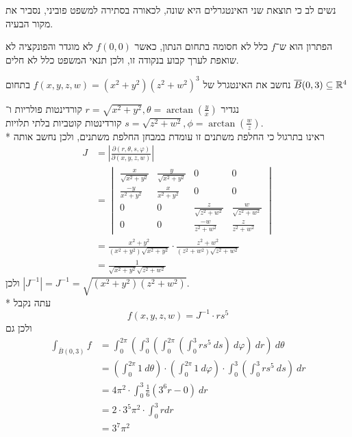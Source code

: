 \Subquestion{}
נשים לב כי תוצאת שני האינטגרלים היא שונה, לכאורה בסתירה למשפט פוביני, נסביר את מקור הבעיה.

הפתרון הוא ש־$f$ כלל לא חסומה בתחום הנתון, כאשר $f(0, 0)$ לא מוגדר והפונקציה לא שואפת לערך קבוע בנקודה זו, ולכן תנאי המשפט כלל לא חלים.

\Question{}
נחשב את האינטגרל של $f(x, y, z, w) = (x^2 + y^2) {(z^2 + w^2)}^3$ בתחום $\overline{B}(0, 3) \subseteq \mathbb{R}^4$

נגדיר $r = \sqrt{x^2 + y^2}, \theta = \arctan(\frac{y}{x})$ קורדינטות פולריות ו־$s = \sqrt{z^2 + w^2}, \phi = \arctan(\frac{w}{z})$ קורדינטות קוטביות בלתי תלויות. \\*
ראינו בתרגול כי החלפת משתנים זו עומדת במבחן החלפת משתנים, ולכן נחשב אותה
\begin{align*}
	J
	& = \left\lvert \frac{\partial(r, \theta, s, \varphi)}{\partial(x, y, z, w)} \right\rvert \\
	& = \begin{vmatrix}
		\frac{x}{\sqrt{x^2 + y^2}} & \frac{y}{\sqrt{x^2 + y^2}} & 0 & 0 \\
		\frac{-y}{x^2 + y^2} & \frac{x}{x^2 + y^2} & 0 & 0 \\
		0 & 0 & \frac{z}{\sqrt{z^2 + w^2}} & \frac{w}{\sqrt{z^2 + w^2}} \\
		0 & 0 & \frac{-w}{z^2 + w^2} & \frac{z}{z^2 + w^2}
	\end{vmatrix} \\
	& = \frac{x^2 + y^2}{(x^2 + y^2) \sqrt{x^2 + y^2}} \cdot \frac{z^2 + w^2}{(z^2 + w^2) \sqrt{z^2 + w^2}} \\
	& = \frac{1}{\sqrt{x^2 + y^2} \sqrt{z^2 + w^2}}
\end{align*}
ולכן $|J^{-1}| = J^{-1} = \sqrt{(x^2 + y^2)(z^2 + w^2)}$. \\*
עתה נקבל
\[
	f(x, y, z, w) = J^{-1} \cdot r s^5
\]
ולכן גם
\begin{align*}
	\int_{\overline{B}(0, 3)} f
	& = \int_{0}^{2 \pi} \left( \int_{0}^{3} \left( \int_0^{2 \pi} \left( \int_0^3 r s^5\ ds \right)\ d\varphi \right)\ dr \right)\ d\theta \\
	& = \left( \int_{0}^{2 \pi} 1\ d\theta\right) \cdot \left( \int_{0}^{2 \pi} 1\ d\varphi \right) \cdot \int_{0}^{3} \left( \int_0^3 r s^5\ ds \right)\ dr \\
	& = 4\pi^2 \cdot \int_0^3 \frac{1}{6} (3^6 r - 0)\ dr \\
	& = 2 \cdot 3^5 \pi^2 \cdot \int_0^3 r dr \\
	& = 3^7 \pi^2
\end{align*}

